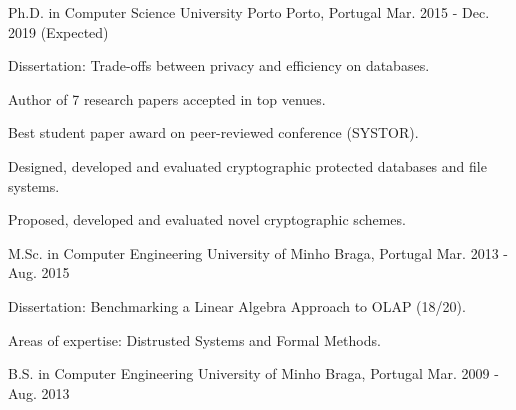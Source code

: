 

\begin{cventries}

  \cventry
    {Ph.D. in Computer Science} %
    {University Porto} %
    {Porto, Portugal} %
    {Mar. 2015 - Dec. 2019 (Expected)} %
    {
      \begin{cvitems} %
        \item {Dissertation: Trade-offs between privacy and efficiency on databases.}
        \item {Author of 7 research papers accepted in top venues.}
        \item {Best student paper award on peer-reviewed conference (SYSTOR).}
        \item {Designed, developed and evaluated cryptographic protected databases and file systems.}
        \item {Proposed, developed and evaluated novel cryptographic schemes.}
      \end{cvitems}
    }


  \cventry
    {M.Sc. in Computer Engineering} %
    {University of Minho} %
    {Braga, Portugal} %
    {Mar. 2013 - Aug. 2015} %
    {
      \begin{cvitems} %
        \item {Dissertation: Benchmarking a Linear Algebra Approach to OLAP (18/20).}
        \item {Areas of expertise: Distrusted Systems and Formal Methods.}
      \end{cvitems}
    }


  \cventry
    {B.S. in Computer Engineering} %
    {University of Minho} %
    {Braga, Portugal} %
    {Mar. 2009 - Aug. 2013} %
    {
    }

\end{cventries}
